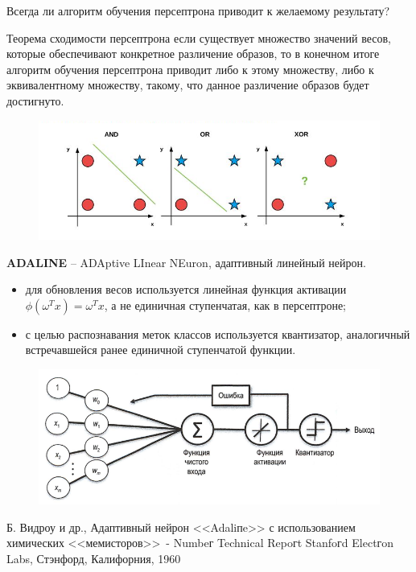 \documentclass{beamer}
\begin{document}
\begin{frame}[t]
	\linespread{1.0}
	Всегда ли алгоритм обучения персептрона приводит к желаемому результату?
	
	\begin{block}{Теорема сходимости персептрона}
		если существует множество значений весов, которые обеспечивают конкретное различение образов, то в конечном итоге алгоритм обучения персептрона приводит либо к этому множеству, либо к эквивалентному множеству, такому, что данное различение образов будет достигнуто.	
	\end{block}
	\begin{figure}[h]
		\centering
		\includegraphics[scale=0.6]{images/lec03-xor.png}
	\end{figure}	
\end{frame}


\begin{frame}[t]
	\textbf{ADALINE} -- ADAptive LInear NEuron, адаптивный линейный нейрон.
	\begin{itemize}
		\item для обновления весов используется линейная функция активации $\phi(\omega^T x) = \omega^Tx$, а не единичная ступенчатая, как в персептроне;
		\item с целью распознавания меток классов используется квантизатор, аналогичный встречавшейся ранее единичной ступенчатой функции.
	\end{itemize}
	\begin{figure}[h]
		\centering
		\includegraphics[scale=0.4]{images/lec03-pic19.png}
	\end{figure}
	Б. Видроу и др., Адаптивный нейрон <<Adaliпe>> с использованием химических <<мемисторов>>~- Numbeг Technical Repoгt Stanfoгd Electгon Labs, Стэнфорд, Калифорния, 1960
\end{frame}
\end{document}
